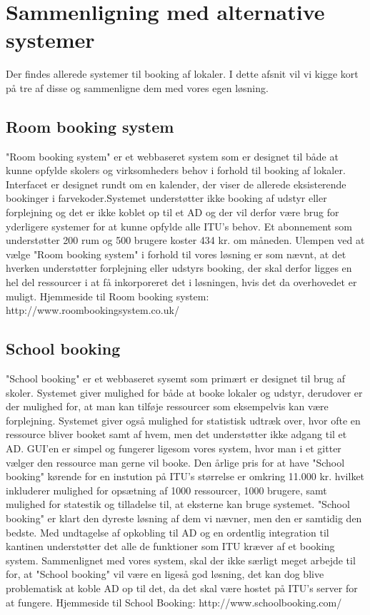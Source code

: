 \section{Sammenligning med alternative systemer}
Der findes allerede systemer til booking af lokaler. I dette afsnit vil vi kigge kort på tre af disse og sammenligne dem med vores egen løsning.

\subsection{Room booking system}
"Room booking system" er et webbaseret system som er designet til både at kunne opfylde skolers og virksomheders behov i forhold til booking af lokaler. Interfacet er designet rundt om en kalender, der viser de allerede eksisterende bookinger i farvekoder.Systemet understøtter ikke booking af udstyr eller forplejning og det er ikke koblet op til et AD og der vil derfor være brug for yderligere systemer for at kunne opfylde alle ITU's behov. Et abonnement som understøtter 200 rum og 500 brugere koster 434 kr. om måneden. Ulempen ved at vælge "Room booking system" i forhold til vores løsning er som nævnt, at det hverken understøtter forplejning eller udstyrs booking, der skal derfor ligges en hel del ressourcer i at få inkorporeret det i løsningen, hvis det da overhovedet er muligt.
Hjemmeside til Room booking system: http://www.roombookingsystem.co.uk/

\subsection{School booking}
"School booking" er et webbaseret sysemt som primært er designet til brug af skoler. Systemet giver mulighed for både at booke lokaler og udstyr, derudover er der mulighed for, at man kan tilføje ressourcer som eksempelvis kan være forplejning. Systemet giver også mulighed for statistisk udtræk over, hvor ofte en ressource bliver booket samt af hvem, men det understøtter ikke adgang til et AD. GUI'en er simpel og fungerer ligesom vores system, hvor man i et gitter vælger den ressource man gerne vil booke. Den årlige pris for at have "School booking" kørende for en instution på ITU's størrelse er omkring 11.000 kr. hvilket inkluderer mulighed for opsætning af 1000 ressourcer, 1000 brugere, samt mulighed for statestik og tilladelse til, at eksterne kan bruge systemet. "School booking" er klart den dyreste løsning af dem vi nævner, men den er samtidig den bedste. Med undtagelse af opkobling til AD og en ordentlig integration til kantinen understøtter det alle de funktioner som ITU kræver af et booking system. Sammenlignet med vores system, skal der ikke særligt meget arbejde til for, at "School booking" vil være en ligeså god løsning, det kan dog blive problematisk at koble AD op til det, da det skal være hostet på ITU's server for at fungere. 
Hjemmeside til School Booking: http://www.schoolbooking.com/


